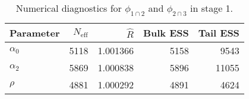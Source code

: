 \begin{table}[!h]
\centering
\begin{tabular}{>{\raggedright\arraybackslash}p{2cm}rrrr}
\toprule
Parameter & $N_{\text{eff}}$ & $\widehat{R}$ & Bulk ESS & Tail ESS\\
\midrule
\rowcolor{gray!6}  $\alpha_{0}$ & 5118 & 1.001366 & 5158 & 9543\\
$\alpha_{2}$ & 5869 & 1.000838 & 5896 & 11055\\
\rowcolor{gray!6}  $\rho$ & 4881 & 1.000292 & 4891 & 4624\\
\bottomrule
\end{tabular}
\caption{Numerical diagnostics for $\phi_{1 \cap 2}$ and $\phi_{2 \cap 3}$ in stage 1.}
\end{table}